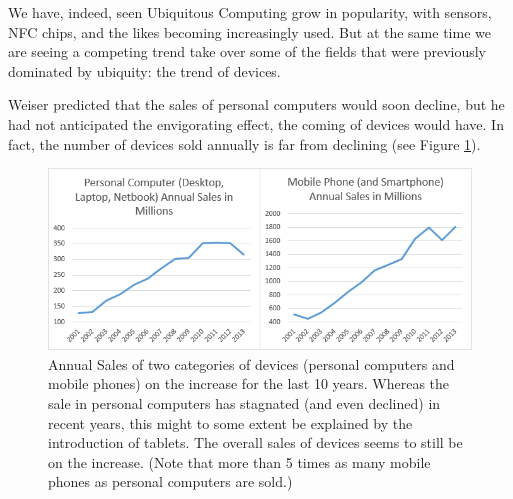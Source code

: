 We have, indeed, seen Ubiquitous Computing grow in popularity, with sensors, NFC chips, and the likes becoming increasingly used. But
at the same time we are seeing a competing trend take over some of the fields that were previously dominated by ubiquity: the trend of
devices.

Weiser predicted that the sales of personal computers would soon decline, but he had not anticipated the envigorating effect, the
coming of devices would have. In fact, the number of devices sold annually is far from declining (see Figure \ref{fig:actual-sales-graph}).

\begin{figure}[htb]
    \centering
    \includegraphics[width=1\textwidth]{multipurpose/actual-sales-graph}
    \caption{Annual Sales of two categories of devices (personal computers and mobile phones) on the increase for the last 10 years.
        Whereas the sale in personal computers has stagnated (and even declined) in recent years, this might to some extent be
        explained by the introduction of tablets. The overall sales of devices seems to still be on the increase. (Note
        that more than 5 times as many mobile phones as personal computers are sold.)\cite{wikipedia-mobiles}\cite{wikipedia-pcs}\protect\footnotemark}
    \label{fig:actual-sales-graph}
\end{figure}


